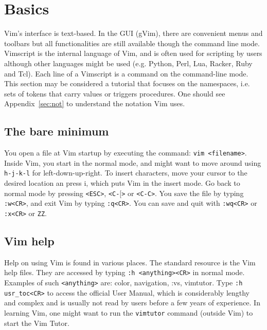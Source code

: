 \documentclass{article}
\newcommand{\ttt}[1] {
	\texttt{<#1>}}
\newcommand{\tttt}[1]{\texttt{#1}}
\begin{document}
\section{Basics}\label{basics}
Vim's interface is text-based.
In the GUI (gVim),
there are convenient menus and toolbars
but all functionalities are still available though
the command line mode.
Vimscript is the internal language of Vim,
and is often used for scripting by users
although other languages might be used 
(e.g. Python, Perl, Lua, Racker, Ruby and Tcl). 
Each line of a Vimscript is a command on the
command-line mode.
This section may be considered a tutorial
that focuses on the namespaces, i.e. sets of tokens
that carry values or triggers procedures.
One should see Appendix~\ref{sec:not}
to understand the notation Vim uses.

\subsection{The bare minimum}\label{minimum}
You open a file at Vim startup by executing
the command: \texttt{vim <filename>}.
Inside Vim, you start in the normal
mode, and might want to move around using
\texttt{h-j-k-l} for left-down-up-right.
To insert characters, move your
cursor to the desired location an press i,
which puts Vim in the insert mode.
Go back to normal mode by pressing
\texttt{<ESC>}, \ttt{C-$[$} or \texttt{<C-C>}.
You save the file by typing \texttt{:w<CR>},
and exit Vim by typing \texttt{:q<CR>}.
You can save and quit with \tttt{:wq<CR>}
or \tttt{:x<CR>} or \tttt{ZZ}.

\subsection{Vim help}
Help on using Vim is found in various places.
The standard resource is the Vim help files.
They are accessed by typing \texttt{:h <anything><CR>}
in normal mode.
Examples of such \texttt{<anything>} are:
color, navigation, :vs, vimtutor.
Type 
\texttt{:h usr\_toc<CR>}
to access the official User Manual,
which is considerably lengthy and complex
and is usually not read by users before a few years
of experience.
In learning Vim, one
might want to run the \texttt{vimtutor} command
(outside Vim) to start the Vim Tutor.
\end{document}
